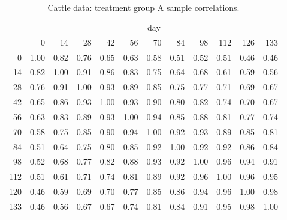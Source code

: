 \documentclass[12pt]{article}
\theoremstyle{definition}
\begin{document}
\begin{table}[ht] \label{table:cattleA-sample-correlations}
\begin{center}
\begin{tabular}{r|rrrrrrrrrrr}
& \multicolumn{11}{c}{day}\\
 & 0 & 14 & 28 & 42 & 56 & 70 & 84 & 98& 112& 126 &133\\ 
  \hline
0 & 1.00 & 0.82 & 0.76 & 0.65 & 0.63 & 0.58 & 0.51 & 0.52 & 0.51 & 0.46 & 0.46 \\ 
  14 & 0.82 & 1.00 & 0.91 & 0.86 & 0.83 & 0.75 & 0.64 & 0.68 & 0.61 & 0.59 & 0.56 \\ 
  28 & 0.76 & 0.91 & 1.00 & 0.93 & 0.89 & 0.85 & 0.75 & 0.77 & 0.71 & 0.69 & 0.67 \\ 
  42 & 0.65 & 0.86 & 0.93 & 1.00 & 0.93 & 0.90 & 0.80 & 0.82 & 0.74 & 0.70 & 0.67 \\ 
  56 & 0.63 & 0.83 & 0.89 & 0.93 & 1.00 & 0.94 & 0.85 & 0.88 & 0.81 & 0.77 & 0.74 \\ 
  70 & 0.58 & 0.75 & 0.85 & 0.90 & 0.94 & 1.00 & 0.92 & 0.93 & 0.89 & 0.85 & 0.81 \\ 
  84 & 0.51 & 0.64 & 0.75 & 0.80 & 0.85 & 0.92 & 1.00 & 0.92 & 0.92 & 0.86 & 0.84 \\ 
  98 & 0.52 & 0.68 & 0.77 & 0.82 & 0.88 & 0.93 & 0.92 & 1.00 & 0.96 & 0.94 & 0.91 \\ 
  112 & 0.51 & 0.61 & 0.71 & 0.74 & 0.81 & 0.89 & 0.92 & 0.96 & 1.00 & 0.96 & 0.95 \\ 
  120 & 0.46 & 0.59 & 0.69 & 0.70 & 0.77 & 0.85 & 0.86 & 0.94 & 0.96 & 1.00 & 0.98 \\ 
  133 & 0.46 & 0.56 & 0.67 & 0.67 & 0.74 & 0.81 & 0.84 & 0.91 & 0.95 & 0.98 & 1.00 \\ 
   \hline
\end{tabular}
\caption{Cattle data: treatment group A sample correlations.}
\end{center}
\end{table}
\end{document}

